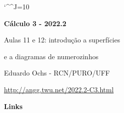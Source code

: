 \documentclass[oneside,12pt]{article}
\begin{document}
\catcode`\^^J=10
\pu
\def\pictgridstyle{\color{GrayPale}\linethickness{0.3pt}}
\def\pictaxesstyle{\linethickness{0.5pt}}
\def\pictnaxesstyle{\color{GrayPale}\linethickness{0.5pt}}
\celllower=2.5pt


\def\u#1{\par{\footnotesize \url{#1}}}

\def\drafturl{http://angg.twu.net/LATEX/2022-2-C3.pdf}
\def\drafturl{http://angg.twu.net/2022.2-C3.html}
\def\draftfooter{\tiny \href{\drafturl}{\jobname{}} \ColorBrown{\shorttoday{} \hours}}



%

\thispagestyle{empty}

\begin{center}

\vspace*{1.2cm}

{\bf \Large Cálculo 3 - 2022.2}

\bsk

Aulas 11 e 12: introdução a superfícies

e a diagramas de numerozinhos

\bsk

Eduardo Ochs - RCN/PURO/UFF

\url{http://angg.twu.net/2022.2-C3.html}

\end{center}

\newpage


{\bf Links}
\end{document}
